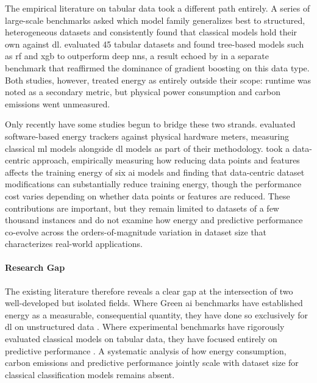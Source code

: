 The empirical literature on tabular data took a different path entirely. A series of large-scale benchmarks asked which model family generalizes best to structured, heterogeneous datasets and consistently found that classical models hold their own against \gls{dl}. \citeauthor{grinsztajnWhyTreebasedModels2022a} \cite{grinsztajnWhyTreebasedModels2022a} evaluated 45 tabular datasets and found tree-based models such as \gls{rf} and \gls{xgb} to outperform deep \glspl{nn}, a result echoed by \citeauthor{gorishniyRevisitingDeepLearning2021a} \cite{gorishniyRevisitingDeepLearning2021a} in a separate benchmark that reaffirmed the dominance of gradient boosting on this data type. Both studies, however, treated energy as entirely outside their scope: runtime was noted as a secondary metric, but physical power consumption and carbon emissions went unmeasured.

Only recently have some studies begun to bridge these two strands. \citeauthor{rodriguezEvaluatingEnergyConsumption2024} \cite{rodriguezEvaluatingEnergyConsumption2024} evaluated software-based energy trackers against physical hardware meters, measuring classical \gls{ml} models alongside \gls{dl} models as part of their methodology. \citeauthor{verdecchiaDataCentricGreenAI2022a} \cite{verdecchiaDataCentricGreenAI2022a} took a data-centric approach, empirically measuring how reducing data points and features affects the training energy of six \gls{ai} models and finding that data-centric dataset modifications can substantially reduce training energy, though the performance cost varies depending on whether data points or features are reduced. These contributions are important, but they remain limited to datasets of a few thousand instances and do not examine how energy and predictive performance co-evolve across the orders-of-magnitude variation in dataset size that characterizes real-world applications.

\paragraph{Research Gap}
The existing literature therefore reveals a clear gap at the intersection of two well-developed but isolated fields. Where Green \gls{ai} benchmarks have established energy as a measurable, consequential quantity, they have done so exclusively for \gls{dl} on unstructured data \parencite{strubellEnergyPolicyConsiderations2019a, dodgeMeasuringCarbonIntensity2022}. Where experimental benchmarks have rigorously evaluated classical models on tabular data, they have focused entirely on predictive performance \parencite{grinsztajnWhyTreebasedModels2022a, gorishniyRevisitingDeepLearning2021a}. A systematic analysis of how energy consumption, carbon emissions and predictive performance jointly scale with dataset size for classical classification models remains absent.

